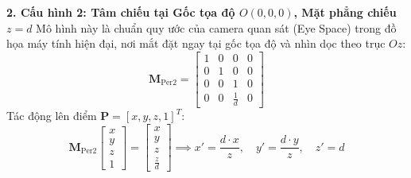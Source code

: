 \textbf{2. Cấu hình 2: Tâm chiếu tại Gốc tọa độ \texorpdfstring{$O(0, 0, 0)$}{O(0, 0, 0)}, Mặt phẳng chiếu \texorpdfstring{$z = d$}{z = d}}
Mô hình này là chuẩn quy ước của camera quan sát (Eye Space) trong đồ họa máy tính hiện đại, nơi mắt đặt ngay tại gốc tọa độ và nhìn dọc theo trục $Oz$:
\begin{equation}
\label{eq:per_config_2}
\mathbf{M}_{\text{Per2}} = \begin{bmatrix}
1 & 0 & 0 & 0 \\
0 & 1 & 0 & 0 \\
0 & 0 & 1 & 0 \\
0 & 0 & \frac{1}{d} & 0
\end{bmatrix}
\end{equation}
Tác động lên điểm $\mathbf{P} = [x, y, z, 1]^T$:
\begin{equation}
\mathbf{M}_{\text{Per2}} \begin{bmatrix} x \\ y \\ z \\ 1 \end{bmatrix} = \begin{bmatrix} x \\ y \\ z \\ \frac{z}{d} \end{bmatrix} \implies x' = \frac{d \cdot x}{z}, \quad y' = \frac{d \cdot y}{z}, \quad z' = d
\end{equation}


